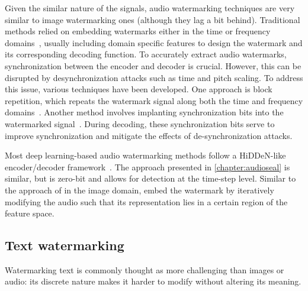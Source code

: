 Given the similar nature of the signals, audio watermarking techniques are very similar to image watermarking ones (although they lag a bit behind). 
Traditional methods relied on embedding watermarks either in the time or frequency domains~\citep{trad_wm_LieC06,trad_wm_KalantariAAA09,trad_wm_NatgunanathanXRZG12,trad_wm_freq_XiangNPHL18,trad_wm_freq_SuZYCJ018,trad_wm_freq_LiuHH19, tai2019audio}, usually including domain specific features to design the watermark and its corresponding decoding function. 
To accurately extract audio watermarks, synchronization between the encoder and decoder is crucial. 
However, this can be disrupted by desynchronization attacks such as time and pitch scaling. 
To address this issue, various techniques have been developed. 
One approach is block repetition, which repeats the watermark signal along both the time and frequency domains~\citep{blockrep2-KirovskiM03, blockrep1-Kirovski2003}. 
Another method involves implanting synchronization bits into the watermarked signal~\citep{patchwork-sync-XiangNGZN14}. During decoding, these synchronization bits serve to improve synchronization and mitigate the effects of de-synchronization attacks.

Most deep learning-based audio watermarking methods follow a \Gls*{HiDDeN}-like encoder/decoder framework~\citep{qu2023audioqr, pavlovic2022robust, DEAR_Liu0FMZY23, ren2023speaking, chen2023wavmark, o2024maskmark}. 
The approach presented in \autoref{chapter:audioseal} is similar, but is zero-bit and allows for detection at the time-step level.
Similar to the approach of \cite{vukotic2018deep} in the image domain, \cite{wu2023adversarial, kong2020adversarial} embed the watermark by iteratively modifying the audio such that its representation lies in a certain region of the feature space.







\subsection{Text watermarking}
Watermarking text is commonly thought as more challenging than images or audio: its discrete nature makes it harder to modify without altering its meaning.

